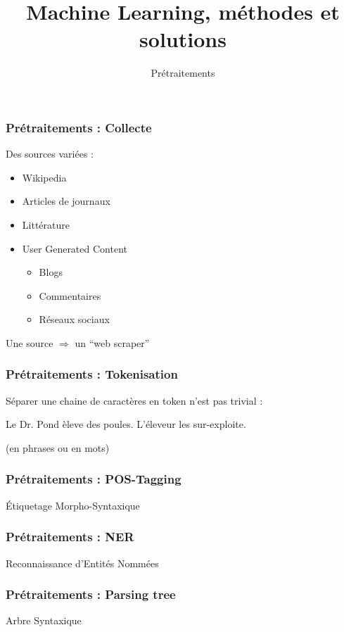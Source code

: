 \documentclass{formation}
\title{Machine Learning, méthodes et solutions}
\subtitle{Prétraitements}
\begin{document}
\maketitle

\begin{frame}
  \frametitle{Prétraitements : Collecte}
  Des sources variées :
  \begin{itemize}
  \item Wikipedia
  \item Articles de journaux
  \item Littérature
  \item User Generated Content
    \begin{itemize}
    \item Blogs
    \item Commentaires
    \item Réseaux sociaux
    \end{itemize}
  \end{itemize}
  Une source $\Rightarrow$ un ``web scraper''
\end{frame}

\begin{frame}
  \frametitle{Prétraitements : Tokenisation}
  Séparer une chaine de caractères en token n'est pas trivial : \\
  \newline
  \begin{center}
    Le Dr. Pond èleve des poules. L'éleveur les sur-exploite.
  \end{center}
  $\;$ \\
  (en phrases ou en mots)
\end{frame}

\begin{frame}
  \frametitle{Prétraitements : POS-Tagging}
  Étiquetage Morpho-Syntaxique
\end{frame}

\begin{frame}
  \frametitle{Prétraitements : NER}
  Reconnaissance d'Entités Nommées
\end{frame}

\begin{frame}
  \frametitle{Prétraitements : Parsing tree}
  Arbre Syntaxique
\end{frame}
\end{document}
